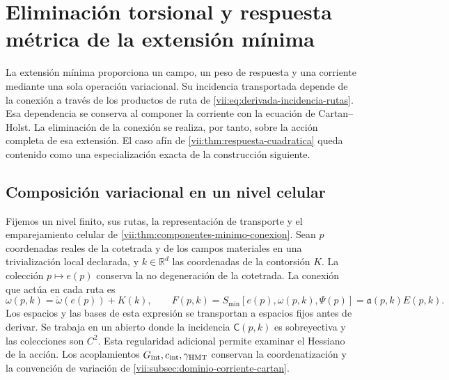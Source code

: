
\section{Eliminación torsional y respuesta métrica de la extensión mínima}
\label{vii:sec:eliminacion-torsional-no-lineal}

La extensión mínima proporciona un campo, un peso de respuesta y una
corriente mediante una sola operación variacional. Su incidencia
transportada depende de la conexión a través de los productos de ruta de
\eqref{vii:eq:derivada-incidencia-rutas}. Esa dependencia se conserva al
componer la corriente con la ecuación de Cartan--Holst. La eliminación
de la conexión se realiza, por tanto, sobre la acción completa de esa
extensión. El caso afín de
\ref{vii:thm:respuesta-cuadratica} queda contenido como una
especialización exacta de la construcción siguiente.

\subsection{Composición variacional en un nivel celular}
\label{vii:subsec:composicion-torsional-celular}

Fijemos un nivel finito, sus rutas, la representación de transporte y
el emparejamiento celular de
\ref{vii:thm:componentes-minimo-conexion}. Sean \(p\) coordenadas
reales de la cotetrada y de los campos materiales en una trivialización
local declarada, y \(k\in\mathbb R^d\) las coordenadas de la
contorsión \(K\). La colección \(p\mapsto e(p)\) conserva la
no degeneración de la cotetrada. La conexión que actúa en cada ruta es
\begin{equation}
 \omega(p,k)=\mathring\omega(e(p))+K(k),\qquad
 F(p,k)=S_{\min}[e(p),\omega(p,k),\Psi(p)]
       =\mathfrak a(p,k)E(p,k).
 \label{vii:eq:accion-minima-en-contorsion}
\end{equation}
Los espacios y las bases de esta expresión se transportan a espacios
fijos antes de derivar. Se trabaja en un abierto donde la incidencia
\(\mathsf C(p,k)\) es sobreyectiva y las colecciones son \(C^2\).
Esta regularidad adicional permite examinar el Hessiano de la acción.
Los acoplamientos \(G_{\rm int},c_{\rm int},\gamma_{\rm HMT}\)
conservan la coordenatización y la convención de variación de
\ref{vii:subsec:dominio-corriente-cartan}.

